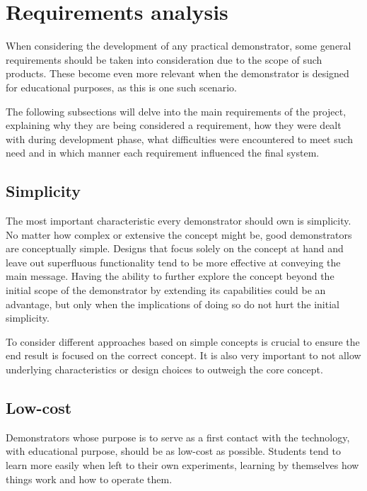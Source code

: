 \section{Requirements analysis} \label{sec:requirements}


When considering the development of any practical demonstrator, some general requirements should be taken into consideration due to the scope of such products.
These become even more relevant when the demonstrator is designed for educational purposes, as this is one such scenario.

The following subsections will delve into the main requirements of the project, explaining why they are being considered a requirement, how they were dealt with during development phase, what difficulties were encountered to meet such need and in which manner each requirement influenced the final system.

\subsection{Simplicity}

The most important characteristic every demonstrator should own is simplicity.
No matter how complex or extensive the concept might be, good demonstrators are conceptually simple.
Designs that focus solely on the concept at hand and leave out superfluous functionality tend to be more effective at conveying the main message.
Having the ability to further explore the concept beyond the initial scope of the demonstrator by extending its capabilities could be an advantage, but only when the implications of doing so do not hurt the initial simplicity.

To consider different approaches based on simple concepts is crucial to ensure the end result is focused on the correct concept.
It is also very important to not allow underlying characteristics or design choices to outweigh the core concept.

\subsection{Low-cost} \label{sec:low-cost}

Demonstrators whose purpose is to serve as a first contact with the technology, with educational purpose, should be as low-cost as possible.
Students tend to learn more easily when left to their own experiments, learning by themselves how things work and how to operate them.

